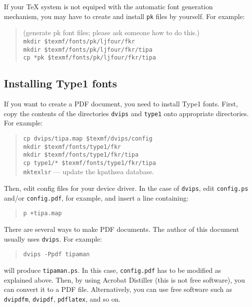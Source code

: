 If your \TeX{} system is not equiped with the automatic font
generation mechanism, you may have to create and install \texttt{pk}
files by yourself. For example:

\begin{quote}
  (generate pk font files; please ask someone how to do this.)\\
  \verb|mkdir $texmf/fonts/pk/ljfour/fkr|\\ %
  \verb|mkdir $texmf/fonts/pk/ljfour/fkr/tipa|\\ %
  \verb|cp *pk $texmf/fonts/pk/ljfour/fkr/tipa| %
\end{quote}


\subsection{Installing Type1 fonts}\label{sec:pdf}

If you want to create a PDF document, you need to install Type1 fonts.
First, copy the contents of the directories \texttt{dvips} and
\texttt{type1} onto appropriate directories. For example:

\begin{quote}
  \verb|cp dvips/tipa.map $texmf/dvips/config|\\ %
  \verb|mkdir $texmf/fonts/type1/fkr|\\ %
  \verb|mkdir $texmf/fonts/type1/fkr/tipa|\\ %
  \verb|cp type1/* $texmf/fonts/type1/fkr/tipa|\\ %
  \verb|mktexlsr| --- update the kpathsea database.
\end{quote}

Then, edit config files for your device driver. In the case
of \texttt{dvips}, edit \texttt{config.ps} and/or \texttt{config.pdf},
for example, and insert a line containing:

\begin{quote}
  \texttt{p +tipa.map}
\end{quote}

There are several ways to make PDF documents. The author of this
document usually uses \texttt{dvips}. For example:

\begin{quote}
  \texttt{dvips -Ppdf tipaman}
\end{quote}

\noindent will produce \texttt{tipaman.ps}. In this case, \texttt{config.pdf}
has to be modified as explained above. Then, by using Acrobat
Distiller (this is not free software), you can convert it to a PDF
file. Alternatively, you can use free software such as
\texttt{dvipdfm}, \texttt{dvipdf}, \texttt{pdflatex}, and so on.

